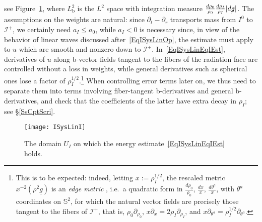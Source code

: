 \documentclass[reqno,11pt,letterpaper]{amsart}
\numberwithin{equation}{section}
\numberwithin{figure}{section}
\theoremstyle{definition}
\theoremstyle{remark}
\newcommand{\ms}{\mathscr}
\newcommand{\scri}{\ms I}
\newcommand{\Sph}{\mathbb{S}}
\newcommand{\slg}{\slashed{g}{}}
\newcommand{\pa}{\partial}
\newcommand{\ul}[1]{\underline{#1}{}}
\newcommand{\bop}{{\mathrm{b}}}
\begin{document}
see Figure~\ref{FigISysLinI}, where $L^2_\bop$ is the $L^2$ space with integration measure $\frac{d\rho_0}{\rho_0}\frac{d\rho_I}{\rho_I}|d\slg|$. The assumptions on the weights are natural: since $\pa_t-\pa_r$ transports mass from $I^0$ to $\scri^+$, we certainly need $a_I\leq a_0$, while $a_I<0$ is necessary since, in view of the behavior of linear waves discussed after~\eqref{EqISysLinOp}, the estimate must apply to $u$ which are smooth and nonzero down to $\scri^+$. In~\eqref{EqISysLinEqIEst}, derivatives of $u$ along b-vector fields tangent to the fibers of the radiation face are controlled without a loss in weights, while general derivatives such as spherical ones lose a factor of $\rho_I^{1/2}$.\footnote{This is to be expected: indeed, letting $x:=\rho_I^{1/2}$, the rescaled metric $x^{-2}(\rho^2 \ul g)$ is an \emph{edge metric} \cite{MazzeoEdge}, i.e.\ a quadratic form in $\frac{d\rho_0}{\rho_0}$, $\frac{d x}{x}$, $\frac{d\theta^a}{x}$, with $\theta^a$ coordinates on $\Sph^2$, for which the natural vector fields are precisely those tangent to the fibers of $\scri^+$, that is, $\rho_0\pa_{\rho_0}$, $x\pa_x=2\rho_I\pa_{\rho_I}$, and $x\pa_{\theta^a}=\rho_I^{1/2}\pa_{\theta^a}$.} When controlling error terms later on, we thus need to separate them into terms involving fiber-tangent b-derivatives and general b-derivatives, and check that the coefficients of the latter have extra decay in $\rho_I$; see \S\ref{SsCptScri}.

\begin{figure}[!ht]
\texttt{[image: ISysLinI]}
\caption{The domain $U_I$ on which the energy estimate~\eqref{EqISysLinEqIEst} holds.}
\label{FigISysLinI}
\end{figure}
\end{document}
